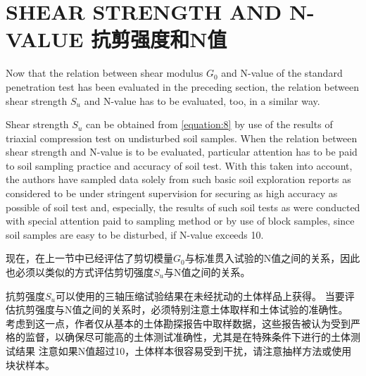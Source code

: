 \section{SHEAR STRENGTH AND N-VALUE 抗剪强度和N值}

\begin{paracol}{2}
    
    Now that the relation between shear modulus $G_0$ and N-value of the standard penetration test has been evaluated in the preceding section, the relation between shear strength $S_u$ and N-value has to be evaluated, too, in a similar way.

    Shear strength $S_u$ can be obtained from \autoref{equation:8} by use of the results of triaxial compression test on undisturbed soil samples. When the relation between shear strength and N-value is to be evaluated, particular attention has to be paid to soil sampling practice and accuracy of soil test. With this taken into account, the authors have sampled data solely from such basic soil exploration reports as considered to be under stringent supervision for securing as high accuracy as possible of soil test and, especially, the results of such soil tests as were conducted with special attention paid to sampling method\citep{Koizumi1968} or by use of block samples, since soil samples are easy to be disturbed, if N-value exceeds 10.

    \switchcolumn

    现在，在上一节中已经评估了剪切模量$G_0$与标准贯入试验的N值之间的关系，因此也必须以类似的方式评估剪切强度$S_u$与N值之间的关系。
        
    抗剪强度$S_u$可以使用的三轴压缩试验结果在未经扰动的土体样品上获得。 当要评估抗剪强度与N值之间的关系时，必须特别注意土体取样和土体试验的准确性。 考虑到这一点，作者仅从基本的土体勘探报告中取样数据，这些报告被认为受到严格的监督，以确保尽可能高的土体测试准确性，尤其是在特殊条件下进行的土体测试结果 注意如果N值超过10，土体样本很容易受到干扰，请注意抽样方法\citep{Koizumi1968}或使用块状样本。

\end{paracol}


